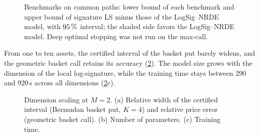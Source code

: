\begin{figure}[htbp]
\centering
\resizebox{\textwidth}{!}{}
\caption{Benchmarks on common paths: lower bound of each benchmark and upper bound of signature LS minus those of the LogSig--NRDE model, with $95\,\%$ interval; the shaded side favors the LogSig--NRDE model. Deep optimal stopping was not run on the max-call.}
\label{fig:benchmarks}
\end{figure}

From one to ten assets, the certified interval of the basket put barely widens, and the geometric basket call retains its accuracy (\cref{fig:dim}). The model size grows with the dimension of the local log-signature, while the training time stays between $290$ and $920$\,s across all dimensions (\cref{fig:dim}c).

\begin{figure}[htbp]
\centering
\resizebox{\textwidth}{!}{}
\caption{Dimension scaling at $M=2$. (a) Relative width of the certified interval (Bermudan basket put, $K=4$) and relative price error (geometric basket call). (b) Number of parameters. (c) Training time.}
\label{fig:dim}
\end{figure}
